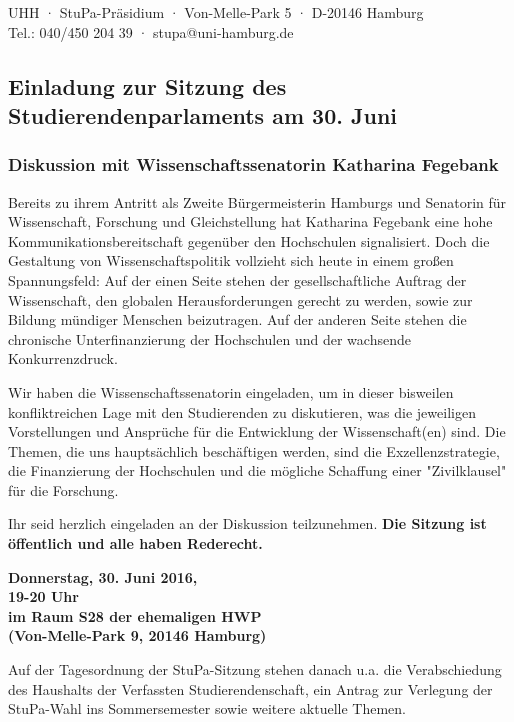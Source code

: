 \documentclass[a5paper,ngerman,headheight=80pt,10pt,DIV=calc]{scrartcl}
\begin{document}
    UHH · StuPa-Präsidium · Von-Melle-Park 5 · D-20146 Hamburg\\
    Tel.: 040/450 204 39 · stupa@uni-hamburg.de

    \subsection*{Einladung zur Sitzung des Studierendenparlaments am 30. Juni}
    \subsubsection*{Diskussion mit Wissenschaftssenatorin Katharina Fegebank}

    Bereits zu ihrem Antritt als Zweite Bürgermeisterin Hamburgs und Senatorin
    für Wissenschaft, Forschung und Gleichstellung hat Katharina Fegebank eine
    hohe Kommunikationsbereitschaft gegenüber den Hochschulen signalisiert. Doch
    die Gestaltung von Wissenschaftspolitik vollzieht sich heute in einem
    großen Spannungsfeld: Auf der einen Seite stehen der gesellschaftliche
    Auftrag der Wissenschaft, den globalen Herausforderungen gerecht zu werden,
    sowie zur Bildung mündiger Menschen beizutragen. Auf der anderen Seite stehen
    die chronische Unterfinanzierung der Hochschulen und der wachsende
    Konkurrenzdruck.

    Wir haben die Wissenschaftssenatorin eingeladen, um in dieser bisweilen
    konfliktreichen Lage mit den Studierenden zu diskutieren, was die jeweiligen
    Vorstellungen und Ansprüche für die Entwicklung der Wissenschaft(en) sind.
    Die Themen, die uns hauptsächlich beschäftigen werden, sind die
    Exzellenzstrategie, die Finanzierung der Hochschulen und die mögliche Schaffung
    einer "Zivilklausel" für die Forschung.

    Ihr seid herzlich eingeladen an der Diskussion teilzunehmen.
    \textbf{Die Sitzung ist öffentlich und alle haben Rederecht.}

    \begin{center}
        \textbf{
        Donnerstag, 30. Juni 2016,\\
        19-20 Uhr\\
        im Raum S28 der ehemaligen HWP\\
        (Von-Melle-Park 9, 20146 Hamburg)}
    \end{center}
    Auf der Tagesordnung der StuPa-Sitzung stehen danach u.a. die Verabschiedung
    des Haushalts der Verfassten Studierendenschaft, ein Antrag zur Verlegung
    der StuPa-Wahl ins Sommersemester sowie weitere aktuelle Themen.
\end{document}
